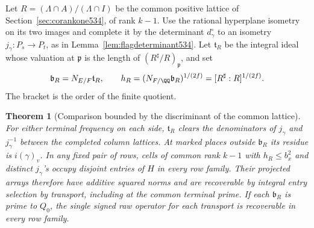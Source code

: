 \documentclass[a4paper,11pt]{article}
\newtheorem{theorem}[proposition]{Theorem}
\theoremstyle{definition}
\theoremstyle{remark}
\numberwithin{equation}{section}
\begin{document}
Let \(R=(\Lambda\cap A)/(\Lambda\cap I)\) be the common positive
lattice of Section~\ref{sec:corankone534}, of rank \(k-1\).
Use the rational hyperplane isometry on its two images and
complete it by the determinant \(d_\gamma^\circ\) to an isometry
\(j_\gamma:P_s\to P_t\), as in Lemma~\ref{lem:flagdeterminant534}.
Let \(\mathfrak t_R\) be the integral ideal whose valuation at
\(\mathfrak p\) is the length of \((R^\sharp/R)_{\mathfrak p}\),
and set
\[
  \mathfrak b_R=N_{E/F}\mathfrak t_R,\qquad
  h_R=(N_{F/\QQ}\mathfrak b_R)^{1/(2f)}
         = [R^\sharp:R]^{1/(2f)} .
\]
The bracket is the order of the finite quotient.

\begin{theorem}[Comparison bounded by the discriminant of the common lattice]
\leavevmode\label{thm:mixedtransport535}
For either terminal frequency on each side, \(\mathfrak t_R\)
clears the denominators of \(j_\gamma\) and \(j_\gamma^{-1}\)
between the completed column lattices. At marked places outside
\(\mathfrak b_R\) its residue is \(i(\gamma)_v\).
In any fixed pair of rows, cells of common rank \(k-1\) with
\(h_R\le b_x^2\) and distinct \(j_\gamma\)'s occupy disjoint
entries of \(H\) in every row family. Their projected arrays
therefore have additive squared norms and are recoverable by
integral entry selection by transport, including at the common
terminal prime. If each \(\mathfrak b_R\) is prime to \(Q_0\),
the single signed raw operator for each transport is recoverable
in every row family.
\end{theorem}
\end{document}
